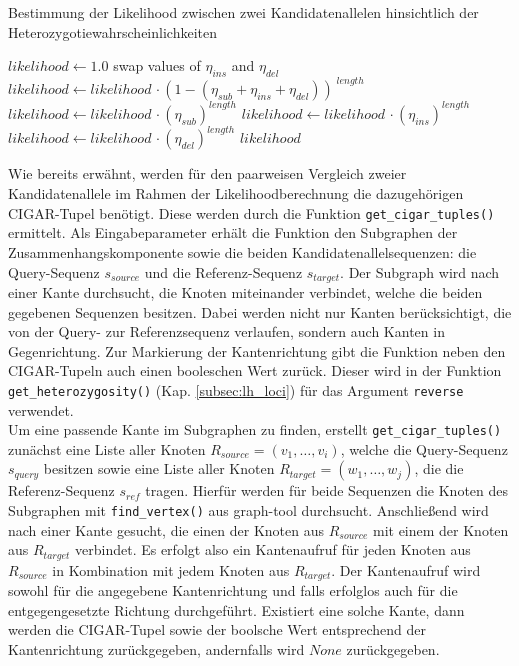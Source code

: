 \begin{algorithm}[H]
	\caption{Bestimmung der Likelihood zwischen zwei Kandidatenallelen hinsichtlich der Heterozygotiewahrscheinlichkeiten}  \label{alg:lh_het}
	\begin{algorithmic}[1]	
		\State $likelihood \gets 1.0$
		\State swap values of $\eta_{ins}$ and $\eta_{del}$
		\EndIf
		\State $ likelihood \gets likelihood \, \cdotp (1 - (\eta_{sub}+\eta_{ins}+\eta_{del}))^{\;length} $
		\EndIf		    		    	
		\State $likelihood \gets likelihood \, \cdotp (\eta_{sub})^{length}$
		\EndIf	
		\State $likelihood \gets likelihood \, \cdotp (\eta_{ins})^{length}$
		\EndIf
		\State $likelihood \gets likelihood \, \cdotp (\eta_{del})^{length}$
		\EndIf
		\EndFor
		\State \Return $ likelihood $
		\EndFunction
	\end{algorithmic}
\end{algorithm}

Wie bereits erwähnt, werden für den paarweisen Vergleich zweier Kandidatenallele im Rahmen der Likelihoodberechnung die dazugehörigen CIGAR-Tupel benötigt. Diese werden durch die Funktion \lstinline|get_cigar_tuples()| ermittelt. Als Eingabeparameter erhält die Funktion den Subgraphen der Zusammenhangskomponente sowie die beiden Kandidatenallelsequenzen: die Query-Sequenz $ s_{source} $ und die Referenz-Sequenz $ s_{target} $. Der Subgraph wird nach einer Kante durchsucht, die Knoten miteinander verbindet, welche die beiden gegebenen Sequenzen besitzen. Dabei werden nicht nur Kanten berücksichtigt, die von der Query- zur Referenzsequenz verlaufen, sondern auch Kanten in Gegenrichtung. Zur Markierung der Kantenrichtung gibt die Funktion neben den CIGAR-Tupeln auch einen booleschen Wert zurück. Dieser wird in der Funktion \lstinline|get_heterozygosity()| (Kap. \ref{subsec:lh_loci}) für das Argument \lstinline|reverse| verwendet. \\

Um eine passende Kante im Subgraphen zu finden, erstellt \lstinline|get_cigar_tuples()| zunächst eine Liste aller Knoten $ R_{source} = (v_{1}, \dots, v_{i})$, welche die Query-Sequenz $ s_{query} $ besitzen sowie eine Liste aller Knoten $ R_{target} = (w_{1}, \dots, w_{j}) $, die die Referenz-Sequenz $ s_{ref} $ tragen. Hierfür werden für beide Sequenzen die Knoten des Subgraphen mit \lstinline|find_vertex()| aus graph-tool durchsucht. Anschließend wird nach einer Kante gesucht, die einen der Knoten aus $ R_{source} $ mit einem der Knoten aus $ R_{target} $ verbindet. Es erfolgt also ein Kantenaufruf für jeden Knoten aus $ R_{source} $ in Kombination mit jedem  Knoten aus $ R_{target} $. Der Kantenaufruf wird sowohl für die angegebene Kantenrichtung und falls erfolglos auch für die entgegengesetzte Richtung durchgeführt. Existiert eine solche Kante, dann werden die CIGAR-Tupel sowie der boolsche Wert entsprechend der Kantenrichtung zurückgegeben, andernfalls wird $ None $ zurückgegeben. \\

